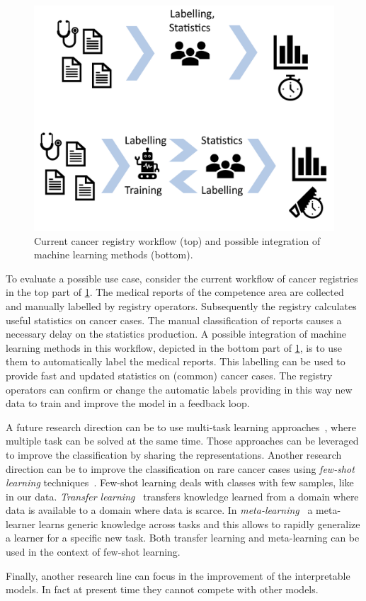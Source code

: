 \begin{figure}
  \centering
  \includegraphics[width=\floatwidth]{img/useCases3.pdf}
  \caption{Current cancer registry workflow (top) and possible
    integration of machine learning methods (bottom).}
  \label{fig:useCases}
\end{figure}
To evaluate a possible use case, consider the current workflow of
cancer registries in the top part of \cref{fig:useCases}. The medical
reports of the competence area are collected and manually labelled by
registry operators. Subsequently the registry calculates useful
statistics on cancer cases. The manual classification of reports
causes a necessary delay on the statistics production.
A possible integration of machine learning methods in this workflow, depicted
in the bottom part 
of \cref{fig:useCases}, is
to use them to automatically label the medical
reports. This labelling can be used to provide fast and
updated statistics on (common) cancer cases. The registry operators
can confirm 
or change the automatic labels providing in this way new data to
train and improve the model in a feedback loop.

A future research direction can be to use multi-task learning
approaches~\cite{caruana1997multitask}, where multiple task can be
solved at the same time. Those 
approaches can be leveraged to improve the classification by sharing
the representations. Another research direction can be to improve the
classification on rare cancer cases using \emph{few-shot learning}
techniques~\cite{wang2019few}. Few-shot learning deals with classes
with few samples, like in our data. \emph{Transfer
  learning}~\cite{pan2009survey} transfers
knowledge learned from a domain where data is available to a domain
where data is scarce. In
\emph{meta-learning}~\cite{hochreiter2001learning} a meta-learner
learns
generic knowledge across tasks and this allows to rapidly generalize a
learner for a specific new task. Both transfer learning and
meta-learning can be used in the context of few-shot learning.

Finally, another research line can focus in the improvement of the
interpretable models. In fact at present time they cannot compete with
other models.

